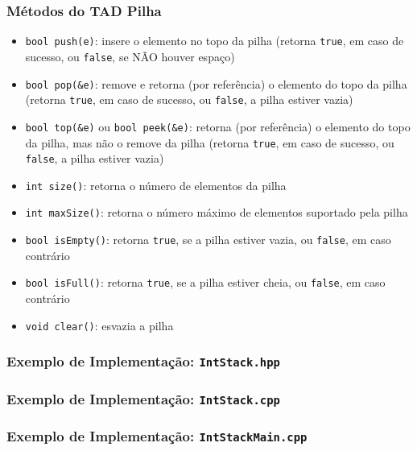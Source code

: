 \documentclass[aspectratio=169]{beamer}
\begin{document}
\begin{frame}\frametitle{Métodos do TAD Pilha}
\begin{itemize}
	\item \texttt{bool push(e)}: insere o elemento no topo da pilha (retorna \texttt{true}, em caso de sucesso, ou \texttt{false}, se NÃO houver espaço)
	\item \texttt{bool pop(\&e)}: remove e retorna (por referência) o elemento do topo da pilha (retorna \texttt{true}, em caso de sucesso, ou \texttt{false}, a pilha estiver vazia)
	\item \texttt{bool top(\&e)} ou \texttt{bool peek(\&e)}: retorna (por referência) o elemento do topo da pilha, mas não o remove da pilha (retorna \texttt{true}, em caso de sucesso, ou \texttt{false}, a pilha estiver vazia)
	\item \texttt{int size()}: retorna o número de elementos da pilha
	\item \texttt{int maxSize()}: retorna o número máximo de elementos suportado pela pilha
	\item \texttt{bool isEmpty()}: retorna \texttt{true}, se a pilha estiver vazia, ou \texttt{false}, em caso contrário
	\item \texttt{bool isFull()}: retorna \texttt{true}, se a pilha estiver cheia, ou \texttt{false}, em caso contrário
	\item \texttt{void clear()}: esvazia a pilha
\end{itemize}
\end{frame}

\begin{frame}\frametitle{Exemplo de Implementação: \texttt{IntStack.hpp}}

\end{frame}

\begin{frame}\frametitle{Exemplo de Implementação: \texttt{IntStack.cpp}}
\fontsize{3pt}{5pt}\selectfont{

}
\end{frame}

\begin{frame}\frametitle{Exemplo de Implementação: \texttt{IntStackMain.cpp}}
\fontsize{5pt}{6pt}\selectfont{

}
\end{frame}
\end{document}

